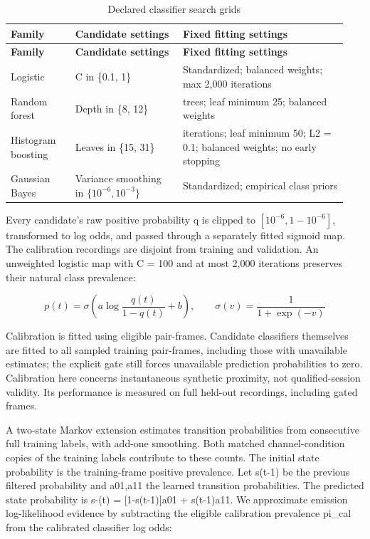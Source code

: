 \documentclass[12pt,a4paper]{report}
\begin{document}
\begingroup
\small{}\setlength{\tabcolsep}{3pt}
\begin{longtable}{>{\raggedright\arraybackslash}p{0.180\linewidth}>{\raggedright\arraybackslash}p{0.300\linewidth}>{\raggedright\arraybackslash}p{0.460\linewidth}}
\caption{Declared classifier search grids}\label{tab:models}\\
\toprule
\textbf{Family} & \textbf{Candidate settings} & \textbf{Fixed fitting settings}\\
\midrule
\endfirsthead
\toprule
\textbf{Family} & \textbf{Candidate settings} & \textbf{Fixed fitting settings}\\
\midrule
\endhead
\bottomrule
\endfoot
Logistic & C  in  \{0.1, 1\} & Standardized; balanced weights; max 2,000 iterations\\
Random forest & Depth  in  \{8, 12\} & 64 trees; leaf minimum 25; balanced weights\\
Histogram boosting & Leaves  in  \{15, 31\} & 80 iterations; leaf minimum 50; L2 = 0.1; balanced weights; no early stopping\\
Gaussian Bayes & Variance smoothing  in  \(\{10^{-6},10^{-3}\}\) & Standardized; empirical class priors\\
\end{longtable}
\endgroup


Every candidate's raw positive probability q is clipped to \([10^{-6},1-10^{-6}]\), transformed to log odds, and passed through a separately fitted sigmoid map. The calibration recordings are disjoint from training and validation. An unweighted logistic map with C = 100 and at most 2,000 iterations preserves their natural class prevalence:

\begin{equation}
p(t)=\sigma\!\left(a\log\frac{q(t)}{1-q(t)}+b\right),\qquad \sigma(v)=\frac{1}{1+\exp(-v)}
\label{eq:source7}
\end{equation}

Calibration is fitted using eligible pair-frames. Candidate classifiers themselves are fitted to all sampled training pair-frames, including those with unavailable estimates; the explicit gate still forces unavailable prediction probabilities to zero. Calibration here concerns instantaneous synthetic proximity, not qualified-session validity. Its performance is measured on full held-out recordings, including gated frames.

A two-state Markov extension estimates transition probabilities from consecutive full training labels, with add-one smoothing. Both matched channel-condition copies of the training labels contribute to these counts. The initial state probability is the training-frame positive prevalence. Let s(t-1) be the previous filtered probability and a01,a11 the learned transition probabilities. The predicted state probability is s-(t) = [1-s(t-1)]a01 + s(t-1)a11. We approximate emission log-likelihood evidence by subtracting the eligible calibration prevalence pi\_cal from the calibrated classifier log odds:
\end{document}

